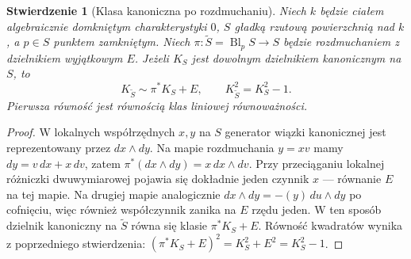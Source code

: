 \documentclass[11pt,a4paper,openany]{report}
\numberwithin{equation}{section}
\theoremstyle{plain}
\newtheorem{stwierdzenie}[twierdzenie]{Stwierdzenie}
\theoremstyle{definition}
\theoremstyle{remark}
\begin{document}
\begin{stwierdzenie}[Klasa kanoniczna po rozdmuchaniu]
\label{st:ga6-Kblowup}
Niech $k$ będzie ciałem algebraicznie domkniętym
charakterystyki $0$, $S$ gładką rzutową powierzchnią
nad $k$, a $p\in S$ punktem zamkniętym. Niech
$\pi:\widetilde S=\operatorname{Bl}_pS\to S$ będzie
rozdmuchaniem z dzielnikiem wyjątkowym $E$.
Jeżeli $K_S$ jest dowolnym dzielnikiem kanonicznym
na $S$, to
\[
 K_{\widetilde S}\sim\pi^*K_S+E,
 \qquad K_{\widetilde S}^2=K_S^2-1.
\]
Pierwsza równość jest równością klas liniowej równoważności.
\end{stwierdzenie}
\begin{proof}
W lokalnych współrzędnych $x,y$ na $S$ generator
wiązki kanonicznej jest reprezentowany przez
$dx\wedge dy$. Na mapie rozdmuchania $y=xv$
mamy $dy=v\,dx+x\,dv$, zatem
$\pi^*(dx\wedge dy)=x\,dx\wedge dv$.
Przy przeciąganiu lokalnej różniczki dwuwymiarowej
pojawia się dokładnie jeden czynnik $x$ — równanie
$E$ na tej mapie. Na drugiej mapie analogicznie
$dx\wedge dy=-(y)\,du\wedge dy$ po cofnięciu,
więc również współczynnik zanika na $E$ rzędu jeden.
W ten sposób dzielnik kanoniczny na $\widetilde S$
równa się klasie $\pi^*K_S+E$.
Równość kwadratów wynika z poprzedniego stwierdzenia:
$(\pi^*K_S+E)^2=K_S^2+E^2=K_S^2-1$.
\end{proof}
\end{document}
